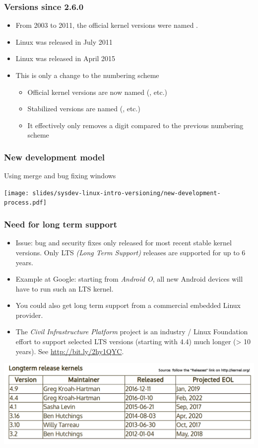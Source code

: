 \begin{frame}
  \frametitle{Versions since 2.6.0}
  \begin{itemize}
  \item From 2003 to 2011, the official kernel versions were named .
  \item Linux  was released in July 2011
  \item Linux  was released in April 2015
  \item This is only a change to the numbering scheme
    \begin{itemize}
    \item Official kernel versions are now named 
      (, etc.)
    \item Stabilized versions are named 
      (, etc.)
    \item It effectively only removes a digit compared to the previous
      numbering scheme
    \end{itemize}
  \end{itemize}
\end{frame}

\begin{frame}
  \frametitle{New development model}
  Using merge and bug fixing windows
  \begin{center}
    \texttt{[image: slides/sysdev-linux-intro-versioning/new-development-process.pdf]}
  \end{center}
\end{frame}

\begin{frame}
  \frametitle{Need for long term support}
  \begin{itemize}
  \item Issue: bug and security fixes only released for most recent
    stable kernel versions. Only LTS {\em (Long Term Support)} releases
    are supported for up to 6 years.
  \item Example at Google: starting from {\em Android O}, all new Android devices will
    have to run such an LTS kernel.
  \item You could also get long term support from a commercial embedded
    Linux provider.
  \item The {\em Civil Infrastructure Platform} project is an industry /
    Linux Foundation effort to support selected LTS versions (starting
    with 4.4) much longer (> 10 years). See \url{http://bit.ly/2hy1QYC}.
  \end{itemize}
  \includegraphics[height=0.3\textheight]{slides/sysdev-linux-intro-versioning/longterm-release-kernels.png}\\
\end{frame}


